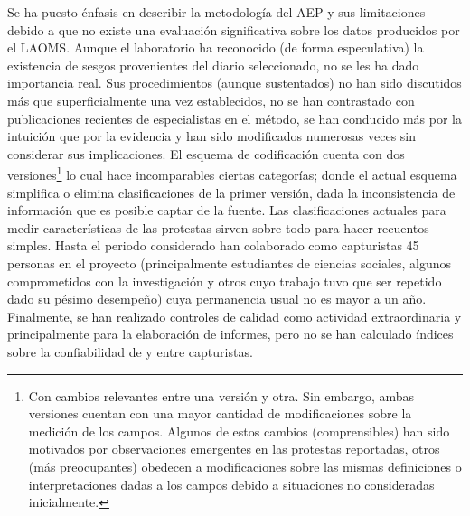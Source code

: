 \documentclass[letterpaper, 11pt]{book}
\theoremstyle{definition}
\theoremstyle{remark}
\begin{document}
Se ha puesto énfasis en describir la metodología del AEP y sus limitaciones debido a que no existe una evaluación significativa sobre los datos producidos por el LAOMS. 
Aunque el laboratorio ha reconocido (de forma especulativa) la existencia de sesgos provenientes del diario seleccionado, no se les ha dado importancia real. 
Sus procedimientos (aunque sustentados) no han sido discutidos más que superficialmente una vez establecidos, no se han contrastado con publicaciones recientes de especialistas en el método, se han conducido más por la intuición que por la evidencia y han sido modificados numerosas veces sin considerar sus implicaciones. 
El esquema de codificación cuenta con dos versiones\footnote{
    Con cambios relevantes entre una versión y otra. 
    Sin embargo, ambas versiones cuentan con una mayor cantidad de modificaciones sobre la medición de los campos. 
    Algunos de estos cambios (comprensibles) han sido motivados por observaciones emergentes en las protestas reportadas, otros (más preocupantes) obedecen a modificaciones sobre las mismas definiciones o interpretaciones dadas a los campos debido a situaciones no consideradas inicialmente.
} 
lo cual hace incomparables ciertas categorías; donde el actual esquema simplifica o elimina clasificaciones de la primer versión, dada la inconsistencia de información que es posible captar de la fuente. 
Las clasificaciones actuales para medir características de las protestas sirven sobre todo para hacer recuentos simples. Hasta el periodo considerado han colaborado como capturistas 45 personas en el proyecto (principalmente estudiantes de ciencias sociales, algunos comprometidos con la investigación y otros cuyo trabajo tuvo que ser repetido dado su pésimo desempeño) cuya permanencia usual no es mayor a un año. 
Finalmente, se han realizado controles de calidad como actividad extraordinaria y principalmente para la elaboración de informes, pero no se han calculado índices sobre la confiabilidad de y entre capturistas.
\end{document}
